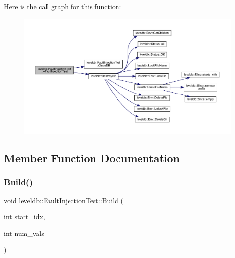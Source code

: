 Here is the call graph for this function\+:
\nopagebreak
\begin{figure}[H]
\begin{center}
\leavevmode
\includegraphics[width=350pt]{classleveldb_1_1_fault_injection_test_a547ba383f26947152eb0c5045d5965c1_cgraph}
\end{center}
\end{figure}


\subsection{Member Function Documentation}
\mbox{\label{classleveldb_1_1_fault_injection_test_aa387332893f14da9bdec0751e151f282}} 
\subsubsection{\texorpdfstring{Build()}{Build()}}
{\footnotesize\ttfamily void leveldb\+::\+Fault\+Injection\+Test\+::\+Build (\begin{DoxyParamCaption}\item[{int}]{start\+\_\+idx,  }\item[{int}]{num\+\_\+vals }\end{DoxyParamCaption})\hspace{0.3cm}{\ttfamily [inline]}}

